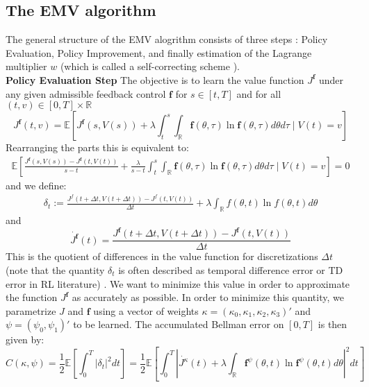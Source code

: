 \documentclass[oneside, a4paper, onecolumn, 11pt]{article}
\begin{document}
\subsection{The EMV algorithm}
The general structure of the EMV alogrithm consists of three steps : Policy Evaluation, Policy Improvement, and finally estimation of the Lagrange multiplier $w$ (which is called a self-correcting scheme  \cite{WangZhou2020}).
\newline
\\\textbf{Policy Evaluation Step}
The objective is to learn the value function $J^{\boldsymbol{f}}$ under any given admissible feedback control $\boldsymbol{f}$ for $s\in [t,T]$ and for all $(t,v) \in [0,T] \times \mathbb{R}$
\begin{equation}
    J^{\boldsymbol{f}}(t,v)= \mathbb{E}\left[ J^{\boldsymbol{f}}(s,V(s)) + \lambda \int_{t}^{s} \int_{\mathbb{R}} \boldsymbol{f}(\theta,\tau) \ln \boldsymbol{f}(\theta,\tau) d\theta d\tau  \mid V(t) = v\right] 
\end{equation}
Rearranging the parts this is equivalent to:
\begin{align*}
    \mathbb{E}\left[\frac{ J^{\boldsymbol{f}}(s,V(s)) -  J^{\boldsymbol{f}}(t,V(t))}{s-t} + \frac{\lambda}{s-t} \int_{t}^{s} \int_{\mathbb{R}} \boldsymbol{f}(\theta,\tau) \ln \boldsymbol{f}(\theta,\tau) d\theta d\tau  \mid V(t) = v \right] = 0 
\end{align*}
and we define: 
\begin{align*}
    \delta_t := \frac{J^f(t+\Delta t, V(t+\Delta t)) - J^f(t,V(t))}{\Delta t} + \lambda \int_{\mathbb{R}} f(\theta, t) \ln f(\theta, t) d\theta    
\end{align*}
and  
\begin{equation*}
    \dot{J^{\boldsymbol{f}}}(t)= \frac{J^{\boldsymbol{f}}(t+\Delta t, V(t+\Delta t)) - J^{\boldsymbol{f}}(t,V(t))}{\Delta t}
\end{equation*}
This is the quotient of differences in the value function for discretizations $\Delta t$ (note that the quantity $\delta_t$ is often described as temporal difference error or TD error in RL literature) \cite{Sutton1988}. We want to minimize this value in order to approximate the function $J^{\boldsymbol{f}}$ as accurately as possible.
In order to minimize this quantity, we parametrize $J$ and $\boldsymbol{f}$ using a vector of weights $\kappa=(\kappa_0,\kappa_1, \kappa_2,\kappa_3)'$ and $\psi = (\psi_0,\psi_1)'$ to be learned. The accumulated Bellman error on $[0,T]$ is then given by:
\begin{equation}
    C(\kappa, \psi)=\frac{1}{2}\mathbb{E}\left[\int_{0}^{T}| \delta_t|^2dt \right] = \frac{1}{2}\mathbb{E}\left[\int_{0}^{T} \left|\dot{J^\kappa}(t) + \lambda\int_\mathbb{R}\boldsymbol{f}^\psi(\theta,t) \ln \boldsymbol{f}^\psi(\theta,t) d\theta \right|^2 dt\right]
\end{equation}
\end{document}
